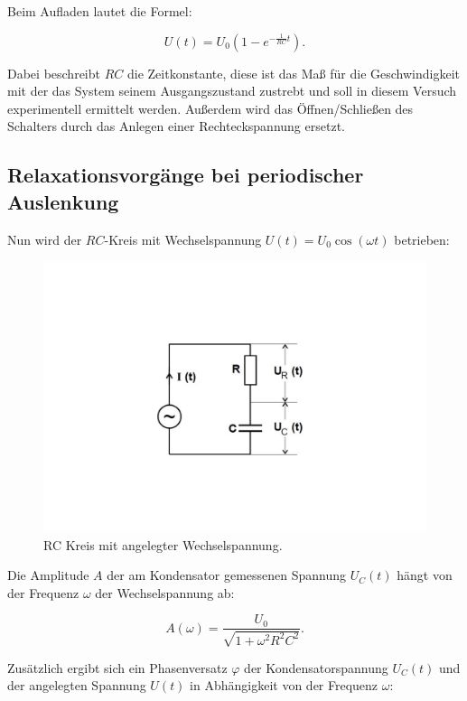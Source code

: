 Beim Aufladen lautet die Formel:

\begin{equation}
    U(t)= U_{0}(1-e^{-\frac{1}{RC}t}).  \label{eqn:Aufladen}
\end{equation}

Dabei beschreibt $RC$ die Zeitkonstante, diese ist das Maß für die Geschwindigkeit mit der das System seinem
Ausgangszustand zustrebt und soll in diesem Versuch experimentell ermittelt werden.
Außerdem wird das Öffnen/Schließen des Schalters durch das Anlegen einer Rechteckspannung ersetzt.

\subsection{Relaxationsvorgänge bei periodischer Auslenkung}
Nun wird der $RC$-Kreis mit Wechselspannung $U(t) = U_{0}\cos(\omega t)$ betrieben:
\begin{figure}
    \centering
    \includegraphics{content/Theorie - RC-Kreis Wechselspannung.pdf}
    \caption{RC Kreis mit angelegter Wechselspannung. \cite{v353}}
    \label{fig:Theorie - RC_Kreis Wechselspannung}
\end{figure}

Die Amplitude $A$ der am Kondensator gemessenen Spannung $U_{C}(t)$ hängt von der Frequenz $\omega$ der Wechselspannung ab:

\begin{equation}
    A(\omega)= \frac{U_{0}}{\sqrt{1+\omega ^{2}R^{2}C^{2}}} . \label{eqn:Tiefpass}
\end{equation}

Zusätzlich ergibt sich ein Phasenversatz $\varphi$ der Kondensatorspannung $U_{C}(t)$ und der angelegten Spannung $U(t)$
in Abhängigkeit von der Frequenz $\omega$:

